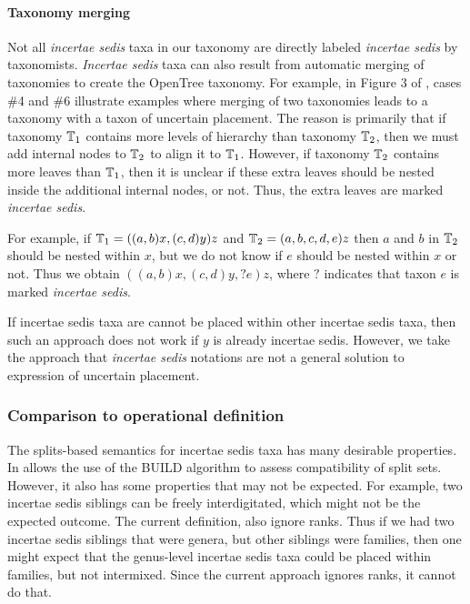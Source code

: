 \documentclass[english]{article}
\begin{document}
\paragraph{Taxonomy merging}

Not all \emph{incertae sedis} taxa in our taxonomy are directly
labeled \emph{incertae sedis} by taxonomists. \emph{Incertae sedis}
taxa can also result from automatic merging of taxonomies to create
the OpenTree taxonomy. For example, in Figure 3 of
\citet{rees2017automated}, cases \#4 and \#6 illustrate examples where
merging of two taxonomies leads to a taxonomy with a taxon of
uncertain placement. The reason is primarily that if taxonomy
$\mbox{\ensuremath{\mathbb{T}}}_{1}$ contains more levels of hierarchy than taxonomy
$\mbox{\ensuremath{\mathbb{T}}}_{2}$, then we must add internal nodes to $\mbox{\ensuremath{\mathbb{T}}}_{2}$ to
align it to $\mbox{\ensuremath{\mathbb{T}}}_{1}$. However, if taxonomy $\mbox{\ensuremath{\mathbb{T}}}_{2}$
contains more leaves than $\mbox{\ensuremath{\mathbb{T}}}_{1}$, then it is unclear if these
extra leaves should be nested inside the additional internal nodes, or
not. Thus, the extra leaves are marked \emph{incertae sedis}.

For example, if $\mbox{\ensuremath{\mathbb{T}}}_{1}=((a,b)x,(c,d)y)z$ and
$\mbox{\ensuremath{\mathbb{T}}}_{2}=(a,b,c,d,e)z$ then $a$ and $b$ in $\mbox{\ensuremath{\mathbb{T}}}_{2}$
should be nested within $x$, but we do not know if $e$ should be
nested within $x$ or not. Thus we obtain $((a,b)x,(c,d)y,?e)z$, where
$?$ indicates that taxon $e$ is marked \emph{incertae sedis}.

If incertae sedis taxa are cannot be placed within other incertae
sedis taxa, then such an approach does not work if $y$ is already
incertae sedis. However, we take the approach that \emph{incertae
sedis} notations are not a general solution to expression of uncertain
placement.

\subsubsection{Comparison to operational definition}

The splits-based semantics for incertae sedis taxa has many desirable
properties. In allows the use of the BUILD algorithm to assess
compatibility of split sets. However, it also has some properties that
may not be expected. For example, two incertae sedis siblings can be
freely interdigitated, which might not be the expected outcome. The
current definition, also ignore ranks. Thus if we had two incertae
sedis siblings that were genera, but other siblings were families,
then one might expect that the genus-level incertae sedis taxa could
be placed within families, but not intermixed. Since the current
approach ignores ranks, it cannot do that.
\end{document}
